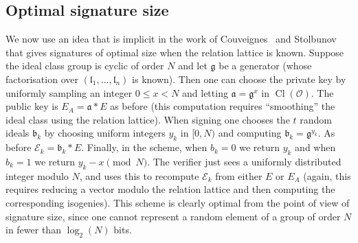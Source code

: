\documentclass{llncs}
\newcommand{\D}{\mathcal{D}}
\newcommand{\E}{\mathcal{E}}
\newcommand{\FF}{\mathcal{F}}
\newcommand{\N}{\mathbb{N}}
\newcommand{\OO}{\mathcal{O}}
\newcommand{\Z}{\mathbb{Z}}
\DeclareMathOperator{\Cl}{Cl}
\renewcommand{\a}{\mathfrak{a}}
\renewcommand{\b}{\mathfrak{b}}
\renewcommand{\l}{\mathfrak{l}}
\newcommand{\g}{\mathfrak{g}}
\newcommand{\x}{\mathbf{x}}
\begin{document}





\subsection{Optimal signature size}


We now use an idea that is implicit in the work of Couveignes~\cite{Couv06} and Stolbunov~\cite{Sto12} that gives signatures of optimal size when the relation lattice is known.
%
%
Suppose the ideal class group is cyclic of order $N$ and let $\g$ be a generator (whose factorisation over $( \l_1, \dots, \l_n )$ is known).
Then one can choose the private key by uniformly sampling an integer $0 \le x < N$ and letting $\a = \g^x$ in $\Cl(\OO)$.
The public key is $E_A = \a * E$ as before (this computation requires ``smoothing'' the ideal class using the relation lattice).
When signing one chooses the $t$ random ideals $\b_k$ by choosing uniform integers $y_k$ in $[0,N)$ and computing $\b_k = \g^{y_k}$.
As before $\E_k = \b_k * E$.
Finally, in the scheme, when $b_k = 0$ we return $y_k$ and when $b_k = 1$ we return $y_k - x \pmod{N}$.
The verifier just sees a uniformly distributed integer modulo $N$, and uses this to recompute $\E_k$ from either $E$ or $E_A$ (again, this requires reducing a vector modulo the relation lattice and then computing the corresponding isogenies).
This scheme is clearly optimal from the point of view of signature size, since one cannot represent a random element of a group of order $N$ in fewer than $\log_2(N)$ bits.
\end{document}
